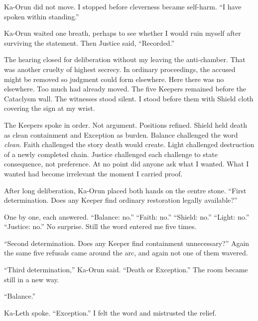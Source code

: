 Ka-Orun did not move. I stopped before cleverness became self-harm. ``I have spoken within standing.''\par

Ka-Orun waited one breath, perhaps to see whether I would ruin myself after surviving the statement. Then Justice said, ``Recorded.''\par

The hearing closed for deliberation without my leaving the anti-chamber. That was another cruelty of highest secrecy. In ordinary proceedings, the accused might be removed so judgment could form elsewhere. Here there was no elsewhere. Too much had already moved. The five Keepers remained before the Cataclysm wall. The witnesses stood silent. I stood before them with Shield cloth covering the sign at my wrist.\par

The Keepers spoke in order. Not argument. Positions refined. Shield held death as clean containment and Exception as burden. Balance challenged the word \emph{clean}. Faith challenged the story death would create. Light challenged destruction of a newly completed chain. Justice challenged each challenge to state consequence, not preference. At no point did anyone ask what I wanted. What I wanted had become irrelevant the moment I carried proof.\par

After long deliberation, Ka-Orun placed both hands on the centre stone. ``First determination. Does any Keeper find ordinary restoration legally available?''\par

One by one, each answered. ``Balance: no.'' ``Faith: no.'' ``Shield: no.'' ``Light: no.'' ``Justice: no.'' No surprise. Still the word entered me five times.\par

``Second determination. Does any Keeper find containment unnecessary?'' Again the same five refusals came around the arc, and again not one of them wavered.\par

``Third determination,'' Ka-Orun said. ``Death or Exception.'' The room became still in a new way.\par

``Balance.''\par

Ka-Leth spoke. ``Exception.'' I felt the word and mistrusted the relief.\par

